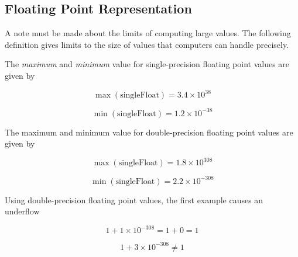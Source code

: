 
\subsection{Floating Point Representation}
	A note must be made about the limits of computing large values. The following definition gives limits to the size of values that computers can handle precisely.

	
\begin{definition}
		The \textit{maximum} and \textit{minimum} value for single-precision floating point values are given by
			
\[
\max(\text{singleFloat}) = 3.4\times 10^{38}
\]
			
\[
\min(\text{singleFloat}) = 1.2\times 10^{-38}
\]

		The maximum and minimum value for double-precision floating point values are given by
			
\[
\max(\text{singleFloat}) = 1.8\times 10^{308}
\]
			
\[
\min(\text{singleFloat}) = 2.2\times 10^{-308}
\]
	
\end{definition}

	
\begin{example}
		Using double-precision floating point values, the first example causes an underflow
			
\[
1 + 1\times 10^{-308} = 1 + 0 = 1
\]
			
\[
1 + 3\times 10^{-308} \not = 1
\]
	
\end{example}
